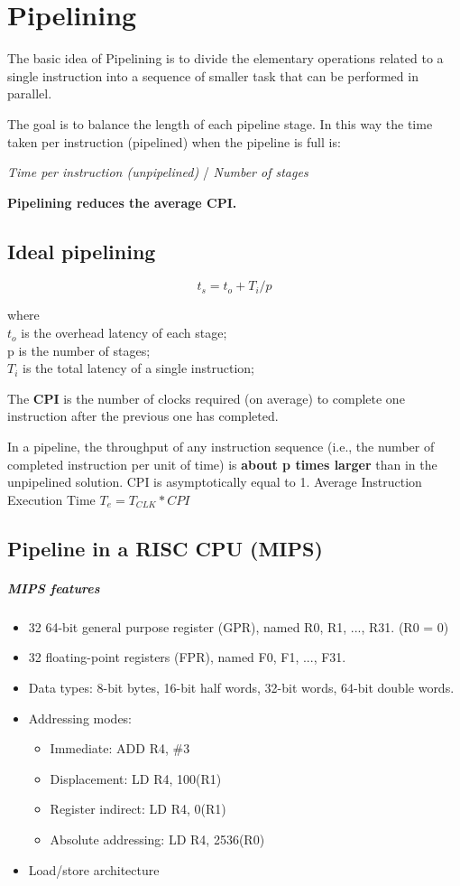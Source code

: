\chapter{Pipelining}

The basic idea of Pipelining is to divide the elementary operations related to a single instruction into a sequence of smaller task that can be performed in parallel.

The goal is to balance the length of each pipeline stage. In this way the time taken per instruction (pipelined) when the pipeline is full is:

\textit{Time per instruction (unpipelined)} / \textit{Number of stages}

\textbf{Pipelining reduces the average CPI.}

\section{Ideal pipelining}

\[ t_s = t_o + T_i/ p \]

where \\
$t_o$ is the overhead latency of each stage;\\
p is the number of stages; \\
$T_i$ is the total latency of a single instruction;

The \textbf{CPI} is the number of clocks required (on average) to complete one instruction after the previous one has completed.

In a pipeline, the throughput of any instruction sequence (i.e., the number of completed instruction per unit of time) is \textbf{about p times larger} than in the unpipelined solution.
CPI is asymptotically equal to 1.
Average Instruction Execution Time $T_e = T_{CLK} * CPI$

\section{Pipeline in a RISC CPU (MIPS)}
\paragraph{MIPS features}
\begin{itemize}
    \item 32 64-bit general purpose register (GPR), named R0, R1, ..., R31. (R0 = 0)
    \item 32 floating-point registers (FPR), named F0, F1, ..., F31.
    \item Data types: 8-bit bytes, 16-bit half words, 32-bit words, 64-bit double words.
    \item Addressing modes:
    \begin{itemize}
        \item Immediate: ADD R4, \#3
        \item Displacement: LD R4, 100(R1)
        \item Register indirect: LD R4, 0(R1)
        \item Absolute addressing: LD R4, 2536(R0)
    \end{itemize}
    \item Load/store architecture
\end{itemize}

